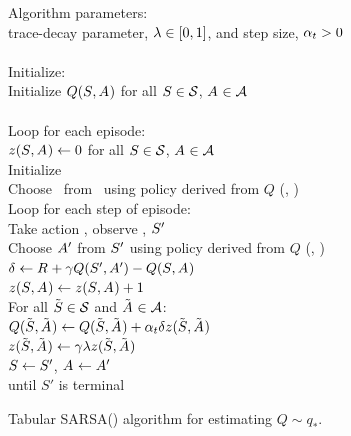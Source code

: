 \begin{table}
\beginalg
Algorithm parameters:\\
\> trace-decay parameter, $\lambda \in [0,1]$, and step size, $\alpha_{t}>0$\\
\\
Initialize:
\\
\> Initialize $Q(S_{}, A_{})$ for all $S_{}\in\mathcal{S}$, $A_{}\in\mathcal{A}$\\
\\
Loop for each episode:\\
\> $z_{}(S_{}, A_{}) \leftarrow 0$ for all ${S_{}}\in\mathcal{S}$, $A_{}\in\mathcal{A}$\\
\> Initialize \state{}\\
\> Choose \action{}\ from \state{}\ using policy derived from $Q$ (\eg, \epsgreedy)\\
\> Loop for each step of episode:\\
\> \> Take action \action, observe \reward{}, $S_{}'$\\
\> \> Choose $A_{}'$ from $S_{}'$ using policy derived from $Q$ (\eg, \epsgreedy)\\
\> \> $\delta_{} \leftarrow R_{} + \gamma Q(S_{}', A_{}') - Q (S_{}, A_{})$\\
\> \> $z_{}(S_{}, A_{}) \leftarrow z_{}(S_{}, A_{}) + 1$\\
\> \> For all $\tilde{S_{}} \in \mathcal{S}$ and $\tilde{A_{}} \in \mathcal{A}$:\\
\> \> \> $Q(\tilde{S_{}}, \tilde{A_{}}) \leftarrow Q(\tilde{S_{}}, \tilde{A_{}}) + \alpha_{t} \delta_{} z_{}(\tilde{S_{}}, \tilde{A_{}})$\\
\> \> \> $z_{}(\tilde{S_{}}, \tilde{A_{}}) \leftarrow \gamma \lambda z_{}(\tilde{S_{}}, \tilde{A_{}})$\\
\> \> $S_{} \leftarrow S_{}'$, $A_{} \leftarrow A_{}'$\\
\> until $S'$ is terminal
\endalg
\caption{Tabular SARSA(\tdparam) algorithm for estimating $Q\sim q_\ast$.}
\label{tab:alg:et:tabular-sarsa}
\end{table}


